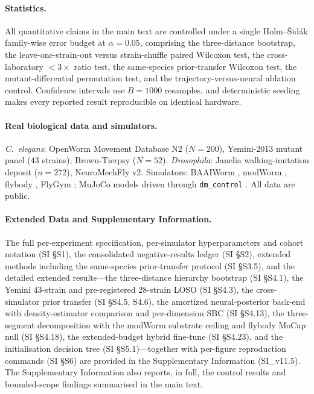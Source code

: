\documentclass[11pt]{article}
\begin{document}
\paragraph{Statistics.} All quantitative claims in the main text are controlled under a single Holm--\v{S}id\'ak family-wise error budget at $\alpha{=}0.05$, comprising the three-distance bootstrap, the leave-one-strain-out versus strain-shuffle paired Wilcoxon test, the cross-laboratory $<3\times$ ratio test, the same-species prior-transfer Wilcoxon test, the mutant-differential permutation test, and the trajectory-versus-neural ablation control. Confidence intervals use $B{=}1000$ resamples, and deterministic seeding makes every reported result reproducible on identical hardware.

\paragraph{Real biological data and simulators.} \emph{C.~elegans}: OpenWorm Movement Database N2 ($N{=}200$), Yemini-2013 mutant panel ($43$ strains), Brown-Tierpsy ($N{=}52$). \emph{Drosophila}: Janelia walking-imitation deposit ($n{=}272$), NeuroMechFly v2. Simulators: BAAIWorm \citep{wang2025baaiworm}, modWorm \citep{shlizerman2025modworm}, flybody \citep{vaxenburg2025flybody}, FlyGym \citep{wangchen2024neuromechfly}; MuJoCo models driven through \texttt{dm\_control} \citep{tunyasuvunakool2020dmcontrol}. All data are public.

\paragraph{Extended Data and Supplementary Information.} The full per-experiment specification, per-simulator hyperparameters and cohort notation (SI \S S1), the consolidated negative-results ledger (SI \S S2), extended methods including the same-species prior-transfer protocol (SI \S S3.5), and the detailed extended results---the three-distance hierarchy bootstrap (SI \S S4.1), the Yemini $43$-strain and pre-registered $28$-strain LOSO (SI \S S4.3), the cross-simulator prior transfer (SI \S S4.5, S4.6), the amortized neural-posterior back-end with density-estimator comparison and per-dimension SBC (SI \S S4.13), the three-segment decomposition with the modWorm substrate ceiling and flybody MoCap null (SI \S S4.18), the extended-budget hybrid fine-tune (SI \S S4.23), and the initialisation decision tree (SI \S S5.1)---together with per-figure reproduction commands (SI \S S6) are provided in the Supplementary Information (SI\_v11.5). The Supplementary Information also reports, in full, the control results and bounded-scope findings summarised in the main text.
\end{document}
